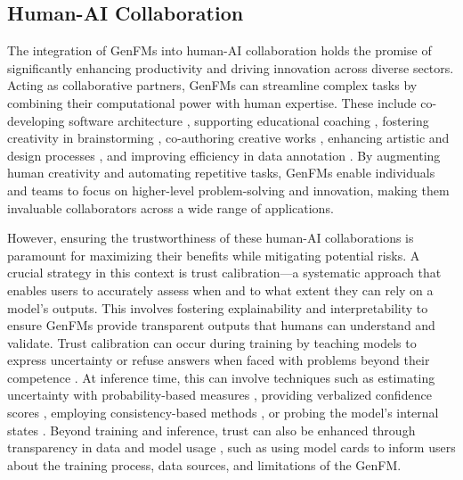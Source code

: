 \subsection{Human-AI Collaboration}
The integration of GenFMs into human-AI collaboration holds the promise of significantly enhancing productivity and driving innovation across diverse sectors. Acting as collaborative partners, GenFMs can streamline complex tasks by combining their computational power with human expertise. These include co-developing software architecture \cite{10.1145/3593434.3593468, si2024design2codebenchmarkingmultimodalcode, peng2023impactaideveloperproductivity}, supporting educational coaching \cite{Nikolopoulou_2024, wang-demszky-2023-chatgpt, hao2024outlining}, fostering creativity in brainstorming \cite{Memmert2024BrainstormingWA, si2024can}, co-authoring creative works \cite{10.1145/3613904.3642134, ippolito2022creativewritingaipoweredwriting, shahid2024examininghumanaicollaborationcowriting, ye2022neuralstoryplanning}, enhancing artistic and design processes \cite{10.1145/3544549.3585680, 10.1145/3519026}, and improving efficiency in data annotation \cite{li-etal-2023-coannotating, shi2024wildfeedbackaligningllmsinsitu, 10.1145/3586183.3606776}. By augmenting human creativity and automating repetitive tasks, GenFMs enable individuals and teams to focus on higher-level problem-solving and innovation, making them invaluable collaborators across a wide range of applications.

However, ensuring the trustworthiness of these human-AI collaborations is paramount for maximizing their benefits while mitigating potential risks. A crucial strategy in this context is trust calibration—a systematic approach that enables users to accurately assess when and to what extent they can rely on a model's outputs. This involves fostering explainability and interpretability to ensure GenFMs provide transparent outputs that humans can understand and validate. Trust calibration can occur during training by teaching models to express uncertainty or refuse answers when faced with problems beyond their competence \cite{cheng2024can, shi-etal-2024-safer, brahman2024the, lin2024flame, zhang-etal-2024-self, liang-etal-2024-learning, yang2024alignment, zhang2024rtuninginstructinglargelanguage}. At inference time, this can involve techniques such as estimating uncertainty with probability-based measures \cite{lin2022teaching, tian-etal-2023-just, kadavath2022languagemodelsmostlyknow}, providing verbalized confidence scores \cite{lin2022teaching, tian-etal-2023-just, kadavath2022languagemodelsmostlyknow, zhou-etal-2024-relying, xiong2024can}, employing consistency-based methods \cite{slobodkin-etal-2023-curious, zhao-etal-2024-knowing, wang2023selfconsistency, cao-etal-2024-defending, cole2023selectively, li-etal-2023-coannotating}, or probing the model's internal states \cite{slobodkin-etal-2023-curious, kadavath2022languagemodelsmostlyknow, chen2024inside, bhardwaj-etal-2024-language}. Beyond training and inference, trust can also be enhanced through transparency in data and model usage \cite{10.1145/3637396}, such as using model cards \cite{Mitchell_2019} to inform users about the training process, data sources, and limitations of the GenFM. 

